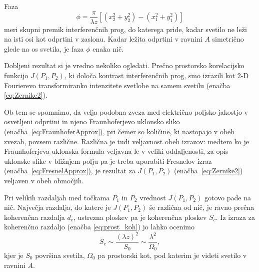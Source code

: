 Faza 
\begin{equation}
\phi=\frac{\pi}{\lambda z}[(x_{2}^{2}+y_{2}^{2})-(x_{1}^{2}+y_{1}^{2})]
\end{equation}
meri skupni premik interferenčnih prog, do katerega pride, kadar svetilo
ne leži na isti osi kot odprtini v zaslonu. Kadar ležita odprtini v ravnini $A$ 
simetrično glede na os svetila, je faza $\phi$ enaka nič.

Dobljeni rezultat si je vredno nekoliko ogledati. Prečno prostorsko
korelacijsko funkcijo $J(P_{1},P_{2})$, ki določa kontrast interferenčnih
prog, smo izrazili kot 2-D  Fourierevo transformiranko intenzitete svetlobe
na samem svetilu (enačba \ref{eq:Zernike2}). 
\begin{remark}
Ob tem se spomnimo,
da velja podobna zveza med električno poljsko jakostjo v osvetljeni odprtini 
in njeno Fraunhoferjevo uklonsko sliko (enačba~\ref{eq:FraunhoferApprox}), 
pri čemer so količine, ki nastopajo v obeh zvezah,
povsem različne. Različna je tudi veljavnost obeh izrazov: medtem ko je Fraunhoferjeva
uklonska formula veljavna le v veliki oddaljenosti, za opis uklonske slike v bližnjem polju
pa je treba uporabiti Fresnelov izraz (enačba~\ref{eq:FresnelApprox}), 
je rezultat za $J(P_{1},P_{2})$ (enačba~\ref{eq:Zernike2}) veljaven v obeh območjih.
\end{remark}

Pri velikih razdaljah med točkama $P_{1}$ in $P_{2}$ vrednost $J(P_{1},P_{2})$ 
gotovo pade na nič. Največja razdalja, do katere je $J(P_{1},P_{2})$ še različna od nič, je ravno
prečna koherenčna razdalja $d_{c}$, ustrezna ploskev pa je koherenčna
ploskev $S_{c}$. Iz izraza za koherenčno razdaljo 
(enačba \ref{eq:prost_koh}) jo lahko ocenimo
\begin{equation}
S_{c}\sim\frac{(\lambda z)^{2}}{S_{0}}\sim\frac{\lambda^{2}}{\Omega_{0}},
\label{eq:koherencna-ploskev}
\end{equation}
kjer je $S_{0}$ površina svetila, $\Omega_{0}$ pa prostorski kot,
pod katerim je videti svetilo v ravnini $A$. 

